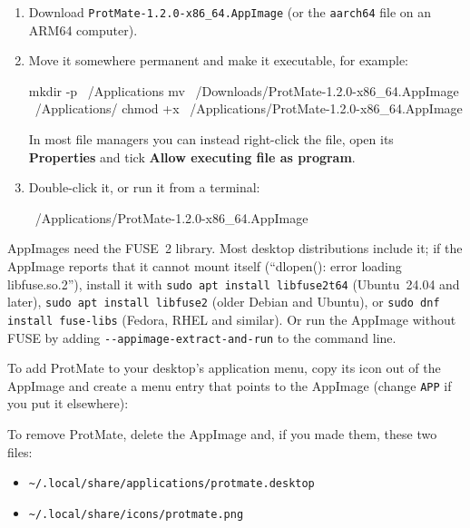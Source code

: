 \documentclass[11pt,a4paper,oneside]{report}
\newcommand{\pmversion}{1.2.0}
\newcommand{\cmd}[1]{\texttt{#1}}            %
\newcommand{\gui}[1]{\textsf{\textbf{#1}}}  %
\begin{document}
\begin{enumerate}
  \item Download \cmd{ProtMate-\pmversion-x86\_64.AppImage} (or the \cmd{aarch64} file on an ARM64
        computer).
  \item Move it somewhere permanent and make it executable, for example:
\begin{terminal}
mkdir -p ~/Applications
mv ~/Downloads/ProtMate-1.2.0-x86_64.AppImage ~/Applications/
chmod +x ~/Applications/ProtMate-1.2.0-x86_64.AppImage
\end{terminal}
        In most file managers you can instead right-click the file, open its \gui{Properties} and
        tick \gui{Allow executing file as program}.
  \item Double-click it, or run it from a terminal:
\begin{terminal}
~/Applications/ProtMate-1.2.0-x86_64.AppImage
\end{terminal}
\end{enumerate}

AppImages need the FUSE~2 library. Most desktop distributions include it; if the AppImage reports
that it cannot mount itself (``dlopen(): error loading libfuse.so.2''), install it with
\cmd{sudo apt install libfuse2t64} (Ubuntu~24.04 and later), \cmd{sudo apt install libfuse2}
(older Debian and Ubuntu), or \cmd{sudo dnf install fuse-libs} (Fedora, RHEL and similar). Or run
the AppImage without FUSE by adding \cmd{-{}-appimage-extract-and-run} to the command line.

To add ProtMate to your desktop's application menu, copy its icon out of the AppImage and create
a menu entry that points to the AppImage (change \cmd{APP} if you put it elsewhere):


To remove ProtMate, delete the AppImage and, if you made them, these two files:
\begin{itemize}
  \item \cmd{\textasciitilde/.local/share/applications/protmate.desktop}
  \item \cmd{\textasciitilde/.local/share/icons/protmate.png}
\end{itemize}
\end{document}

